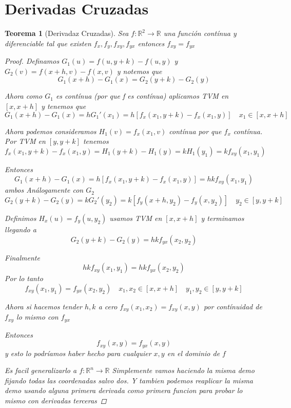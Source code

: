 \documentclass{article}
\theoremstyle{break}
\newtheorem{theorem}{Teorema}[section]
\begin{document}
\section{Derivadas Cruzadas}
\begin{theorem}[Derivadaz Cruzadas]
  Sea $f:\mathbb{R}^{2} \longrightarrow \mathbb{R}$ una función contínua y diferenciable tal que existen $f_x,f_y,f_{xy},f_{yx}$ entonces $f_{xy} = f_{yx}$
  \begin{proof}
    Definamos $G_1(u) = f(u,y+k) - f(u,y)$ y $G_2(v) = f(x+h,v) - f(x,v)$ y notemos que 
    $$G_1(x+h) - G_1(x) = G_2(y+k) - G_2 (y)$$

    Ahora como $G_1$ es contínua (por que f es contínua) aplicamos TVM en $[x,x+h]$
    y tenemos que $$ G_1(x+h) - G_1(x) = hG_1'(x_1) = h[f_x(x_1,y+k) - f_x(x_1,y)]
    \quad x_1 \in [x,x+h]$$

    Ahora podemos consideramos $H_1(v) = f_x(x_1,v)$ contínua por que $f_x$ contínua. 
    Por TVM en $[y,y+k]$ tenemos 
    $$ f_x(x_1,y+k) - f_x(x_1,y)= H_1(y+k) - H_1(y) = kH_1(y_1) = k f_{xy}(x_1,y_1)$$
  
    Entonces $$G_1(x+h) - G_1(x) = h[f_x(x_1,y+k) - f_x(x_1,y)] = hkf_{xy}(x_1,y_1)$$
ambos
    Análogamente con $G_2$
    $$ G_2(y+k) - G_2(y) = kG_2'(y_2) = k[f_y(x+h,y_2) - f_y(x,y_2)]
    \quad y_2 \in [y,y+k]$$

    Definimos $H_x(u) =f_y(u,y_2)$ usamos TVM en $[x,x+h]$ y terminamos llegando a 
    $$G_2(y+k) - G_2(y) = hkf_{yx}(x_2,y_2)$$

    Finalmente $$hkf_{xy}(x_1,y_1) = hkf_{yx}(x_2,y_2)$$ 
    Por lo tanto $$ f_{xy}(x_1,y_1) = f_{yx}(x_2,y_2) \quad x_1,x_2\in [x,x+h] 
    \quad y_1,y_2\in[y,y+k]$$

    Ahora si hacemos tender $h,k$ a cero $f_{xy}(x_1,x_2) = f_{xy}(x,y)$ 
    por contínuidad de $f_{xy}$ lo mismo con $f_{yx}$

    Entonces $$f_{xy}(x,y) = f_{yx} (x,y) $$ y esto lo podríamos haber hecho para cualquier $x,y$ en el dominio de $f$

    Es facil generalizarlo a $ f:\mathbb{R}^{n} \longrightarrow \mathbb{R}  $
    Simplemente vamos haciendo la misma demo fijando todas las coordenadas salvo dos. Y tambien podemos reaplicar la misma demo usando alguna primera derivada como primera funcion para probar lo mismo con derivadas terceras

  \end{proof}
\end{theorem}
\end{document}

